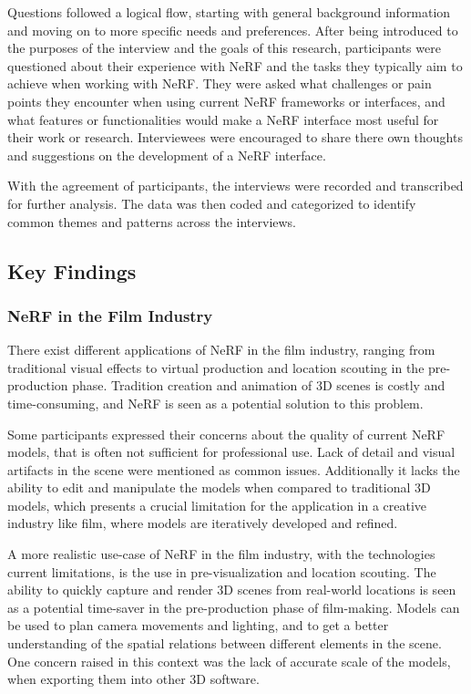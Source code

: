 Questions followed a logical flow, starting with general background information and moving on to more specific needs and preferences. 
After being introduced to the purposes of the interview and the goals of this research, participants were questioned about their experience with NeRF and the tasks they typically aim to achieve when working with NeRF. 
They were asked what challenges or pain points they encounter when using current NeRF frameworks or interfaces, and what features or functionalities would make a NeRF interface most useful for their work or research.
Interviewees were encouraged to share there own thoughts and suggestions on the development of a NeRF interface.

With the agreement of participants, the interviews were recorded and transcribed for further analysis. 
The data was then coded and categorized to identify common themes and patterns across the interviews.

\subsection{Key Findings}
\label{sec:methodology:user-research:findings}

\subsubsection{NeRF in the Film Industry}

There exist different applications of NeRF in the film industry, ranging from traditional visual effects to virtual production and location scouting in the pre-production phase. 
Tradition creation and animation of 3D scenes is costly and time-consuming, and NeRF is seen as a potential solution to this problem. 

Some participants expressed their concerns about the quality of current NeRF models, that is often not sufficient for professional use.
Lack of detail and visual artifacts in the scene were mentioned as common issues.
Additionally it lacks the ability to edit and manipulate the models when compared to traditional 3D models, which presents a crucial limitation for the application in a creative industry like film, where models are iteratively developed and refined.

A more realistic use-case of NeRF in the film industry, with the technologies current limitations, is the use in pre-visualization and location scouting.
The ability to quickly capture and render 3D scenes from real-world locations is seen as a potential time-saver in the pre-production phase of film-making.
Models can be used to plan camera movements and lighting, and to get a better understanding of the spatial relations between different elements in the scene.
One concern raised in this context was the lack of accurate scale of the models, when exporting them into other 3D software.

